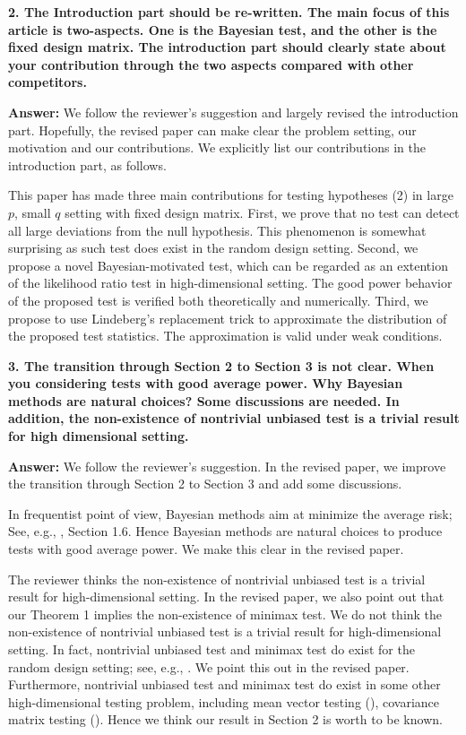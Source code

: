 \documentclass[11pt]{article}
\theoremstyle{plain}
\theoremstyle{definition}
\theoremstyle{remark}
\begin{document}
\textbf{
    2. The Introduction part should be re-written.
    The main focus of this article is two-aspects.
    One is the Bayesian test, and the other is the fixed design matrix. 
    The introduction part should clearly state about your contribution through the two aspects compared with other competitors.
}

\textbf{Answer:}
We follow the reviewer's suggestion and largely revised the introduction part.
Hopefully, the revised paper can make clear the problem setting, our motivation and our contributions.
We explicitly list our contributions in the introduction part, as follows.

\begin{adjustwidth}{3em}{3em}
    This paper has made three main contributions for testing hypotheses (2) in large $p$, small $q$ setting with fixed design matrix.
First, we prove that no test can detect all large deviations from the null       hypothesis.
This phenomenon is somewhat surprising as such test does exist in the random     design setting.
Second, we propose a novel Bayesian-motivated test, which can be regarded as an  extention of the likelihood ratio test in high-dimensional setting.
The good power behavior of the proposed test is verified both theoretically and  numerically.
Third, we propose to use Lindeberg's replacement trick to approximate the        distribution of the proposed test statistics.
The approximation is valid under weak conditions.
\end{adjustwidth}



\textbf{
    3. The transition through Section 2 to Section 3 is not clear.
    When you considering tests with good average power.
    Why Bayesian methods are natural choices?
    Some discussions are needed. In addition, the non-existence of nontrivial unbiased test is a trivial result for high dimensional setting.
}

\textbf{Answer:}
We follow the reviewer's suggestion.
In the revised paper,  we improve the transition through Section 2 to Section 3 and add some discussions.

In frequentist point of view, Bayesian methods aim at minimize the average risk;
See, e.g., \cite{Lehmann}, Section 1.6.
Hence Bayesian methods are natural choices to produce tests with good average power.
We make this clear in the revised paper.

The reviewer thinks the non-existence of nontrivial unbiased test is a trivial result for high-dimensional setting.
In the revised paper, we also point out that our Theorem 1 implies the non-existence of minimax test.
We do not think the non-existence of nontrivial unbiased test is a trivial result for high-dimensional setting.
In fact, nontrivial unbiased test and minimax test do exist for the random design setting; see, e.g., \cite{Ingster2010}.
We point this out in the revised paper.
Furthermore, nontrivial unbiased test and minimax test do exist in some other high-dimensional testing problem, including mean vector testing (\cite{Tony2013}), covariance matrix testing (\cite{Cai2013Optimal}).
Hence we think our result in Section 2 is worth to be known.
\end{document}
